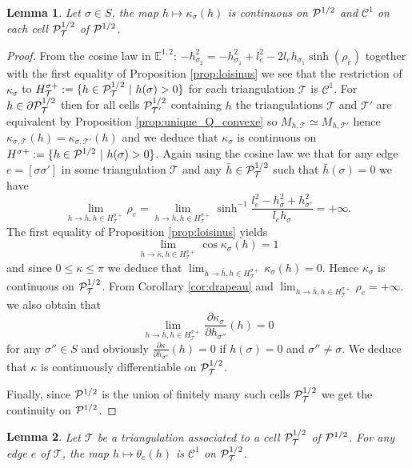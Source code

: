 \documentclass[a4paper,12pt]{article}
\def\TT{\mathcal T}
\newcommand{\mass}[1]{{\mathbb E}^{1,2}_{#1}}
\newtheorem{lem}{Lemma}[section]		 %
\theoremstyle{definition}
\begin{document}
                    \begin{lem}\label{lem:kappa_continuous} Let $\sigma\in S$, the map $h\mapsto \kappa_\sigma(h)$
					 is continuous on $\mathcal{P}^{1/2}$ and $\mathscr C^1$ on each cell $\PsqTT$ of $\mathcal{P}^{1/2}$.
					\end{lem}
					\begin{proof}
					  
					 From the cosine law in $\mass{}$: $-h_{\sigma_2}^2 =-h_{\sigma_1}^2+l_e^2 - 2 l_e h_{\sigma_1} \sinh(\rho_e)$ together with the first equality of Proposition \ref{prop:loisinus} we see that the restriction of $\kappa_\sigma$ to $H^{\sigma+}_{\TT}:=\{h\in \PsqTT~|~h(\sigma)>0\}$ for each triangulation $\TT$ is $\mathscr C^1$. For $h\in \partial \PsqTT$ then for all cells $\Psq_{\TT'}$ containing $h$
					 the triangulations $\TT$ and $\TT'$ are equivalent by Proposition \ref{prop:unique_Q_convexe} so 
					 $M_{h,\TT}\simeq M_{h,\TT'}$ hence $\kappa_{\sigma,\TT}(h) = \kappa_{\sigma,\TT'}(h)$ and we deduce that $\kappa_\sigma$ is continuous on $H^{\sigma+}:=\{h\in\mathcal{P}^{1/2}~|~h(\sigma)>0\}$.  
					 Again using the cosine law we that for any edge $e=[\sigma\sigma']$ in some triangulation $\TT$ and any $\bar h \in \PsqTT$ such that $\bar h(\sigma)=0$ we have
					 $$\lim_{h \rightarrow \bar h,h\in H^{\sigma+}_{\TT} } \rho_e = \lim_{h \rightarrow \bar h,h\in H^{\sigma+}_{\TT} } \sinh^{-1}\frac{l_e^2-h_\sigma^2+h_{\sigma'}^2}{l_eh_\sigma} =+\infty.$$ The first equality of Proposition \ref{prop:loisinus} yields $$\displaystyle\lim_{h\rightarrow\bar\kappa,h\in H^{\sigma+}_{\TT} } \cos \kappa_\sigma(h) = 1$$ and since $0\leq\kappa\leq\pi$ we deduce that $\displaystyle\lim_{h\rightarrow\bar h,h\in H^{\sigma+}_{\TT} } \kappa_\sigma(h)=0$. Hence $\kappa_\sigma$ is continuous on $\PsqTT$.
					 From Corollary \ref{cor:drapeau} and $\lim_{h \rightarrow \bar h,h\in H^{\sigma+}_{\TT} } \rho_e =+\infty.$ we also obtain that 
					 $$\lim_{h \rightarrow \bar h,h\in H^{\sigma+}_{\TT} }\frac{\partial \kappa_\sigma}{\partial h_{\sigma''}}(h) = 0$$ for any $\sigma''\in S$
					 and obviously $\frac{\partial \kappa}{\partial h_{\sigma''}}(h) = 0 $ if $h(\sigma)=0$ and $\sigma''\neq \sigma$. We deduce that $\kappa$ is continuously differentiable on $\PsqTT$.  
                    
					 
					 Finally, since $\mathcal{P}^{1/2}$ is the union of finitely many such cells $\PsqTT$ we get the continuity on $\mathcal{P}^{1/2}$.\end{proof}
                    \begin{lem}\label{lem:theta_continuous}
                     Let $\TT$ be a triangulation associated to a cell $\PsqTT$ of $\mathcal{P}^{1/2}$. For any edge $e$ of $\TT$, the map $h\mapsto \theta_e(h)$  is $\mathscr C^1$ on $\PsqTT$.
                    \end{lem}
\end{document}
